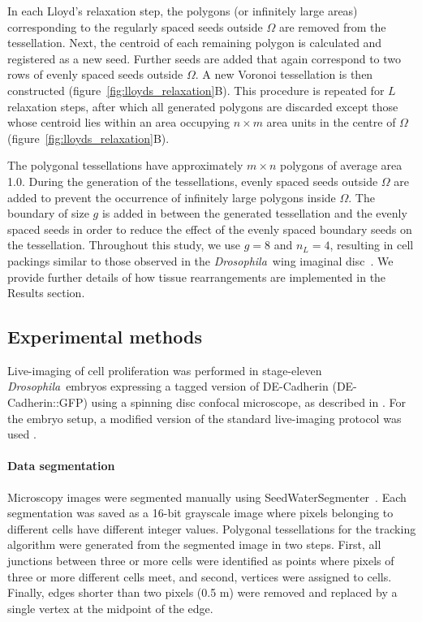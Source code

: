 \documentclass[a4paper,11pt]{article}
\newcommand{\Drosophila}{\textit{Drosophila}~}
\begin{document}
In each Lloyd's relaxation step, the polygons (or infinitely large areas) corresponding to the regularly spaced seeds outside $\Omega$ are removed from the tessellation. Next, the centroid of each remaining polygon is calculated and registered as a new seed. Further seeds are added that again correspond to two rows of evenly spaced seeds outside $\Omega$. 
A new Voronoi tessellation is then constructed (figure~\ref{fig:lloyds_relaxation}B). 
This procedure is repeated for $L$ relaxation steps, after which all generated polygons are discarded except those whose centroid lies within an area occupying $n\times m$ area units in the centre of $\Omega$ (figure~\ref{fig:lloyds_relaxation}B). 

The polygonal tessellations have approximately $m\times n$ polygons of average area 1.0. 
During the generation of the tessellations, evenly spaced seeds outside $\Omega$ are added to prevent the occurrence of infinitely large polygons inside $\Omega$. 
The boundary of size $g$ is added in between the generated tessellation and the evenly spaced seeds in order to reduce the effect of the evenly spaced boundary seeds on the tessellation. Throughout this study, we use $g=8$ and $n_L=4$, resulting in cell packings similar to those observed in the \Drosophila wing imaginal disc~\cite{Sanchez-Gutierrez2015}. We provide further details of how tissue rearrangements are implemented in the Results section. 

\subsection*{Experimental methods}

Live-imaging of cell proliferation was performed in stage-eleven \Drosophila embryos expressing a tagged version of DE-Cadherin (DE-Cadherin::GFP) using a spinning disc confocal microscope, as described in \cite{Narciso2015}. For the embryo setup, a modified version of the standard live-imaging protocol was used \cite{Parton2010}.


\paragraph{Data segmentation}

Microscopy images were segmented manually using Seed\-Wa\-ter\-Seg\-men\-ter~\cite{Mashburn2012}. 
Each segmentation was saved as a 16-bit grayscale image where pixels belonging to different cells have different integer values. 
Polygonal tessellations for the tracking algorithm were generated from the segmented image in two steps. 
First, all junctions between three or more cells were identified as points where pixels of three or more different cells meet, and second, vertices were assigned to cells. 
Finally, edges shorter than two pixels (0.5 \textmu m) were removed and replaced by a single vertex at the midpoint of the edge.
\end{document}
